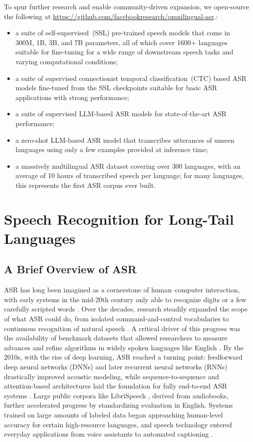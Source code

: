 \documentclass[]{fairmeta}
\begin{document}
To spur further research and enable community-driven expansion, we open-source the following at  \url{https://github.com/facebookresearch/omnilingual-asr}.:
\begin{itemize}
    \item a suite of self-supervised~(SSL) pre-trained speech models that come in 300M, 1B, 3B, and 7B parameters, all of which cover 1600+ languages suitable for fine-tuning for a wide range of downstream speech tasks and varying computational conditions;
    \item a suite of supervised connectionist temporal classification~(CTC) based ASR models fine-tuned from the SSL checkpoints suitable for basic ASR applications with strong performance;
    \item a suite of supervised LLM-based ASR models for state-of-the-art ASR performance;
    \item a zero-shot LLM-based ASR model that transcribes utterances of unseen languages using only a few examples provided at inference time;
    \item a massively multilingual ASR dataset covering over 300 languages, with an average of 10 hours of transcribed speech per language; for many languages, this represents the first ASR corpus ever built.
\end{itemize}


\section{Speech Recognition for Long-Tail Languages}
\label{section:problem}

\subsection{A Brief Overview of ASR}

ASR has long been imagined as a cornerstone of human–computer interaction, with early systems in the mid-20th century only able to recognize digits or a few carefully scripted words \citep{davis1952automatic}. Over the decades, research steadily expanded the scope of what ASR could do, from isolated command-and-control vocabularies to continuous recognition of natural speech \citep{young1996review}. A critical driver of this progress was the availability of benchmark datasets that allowed researchers to measure advances and refine algorithms in widely spoken languages like English \citep{garofolo1993timit}. By the 2010s, with the rise of deep learning, ASR reached a turning point: feedforward deep neural networks (DNNs) and later recurrent neural networks (RNNs) drastically improved acoustic modeling, while sequence-to-sequence and attention-based architectures laid the foundation for fully end-to-end ASR systems \citep{chorowski2015attention,graves2014towards}. Large public corpora like LibriSpeech \citep{panayotov2015librispeech}, derived from audiobooks, further accelerated progress by standardizing evaluation in English.
Systems trained on large amounts of labeled data began approaching human-level accuracy for certain high-resource languages, and speech technology entered everyday applications from voice assistants to automated captioning \citep{radford2023robust}.
\end{document}
